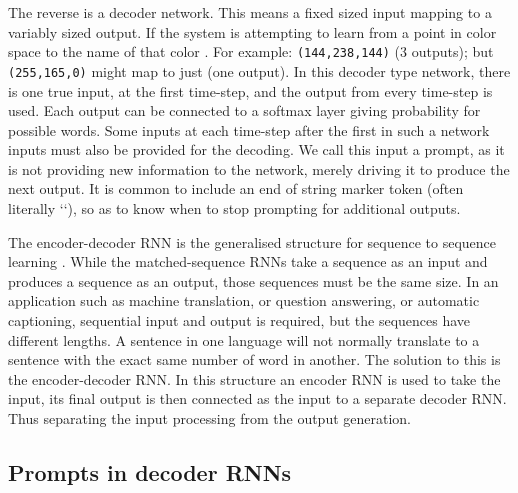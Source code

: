 \documentclass[12pt,parskip]{komatufte}
\begin{document}


The reverse is a decoder network.
This means a fixed sized input mapping to a variably sized output.
If the system is attempting to learn from a point in color space to the name of that color .
For example: \texttt{(144,238,144)}  (3 outputs); but \texttt{(255,165,0)} might map to just  (one output).
In this decoder type network, there is one true input, at the first time-step, and the output from every time-step is used.
Each output can be connected to a softmax layer giving probability for possible words.
Some inputs at each time-step after the first in such a network inputs must also be provided for the decoding.
We call this input a prompt, as it is not providing new information to the network, merely driving it to produce the next output.
It is common to include an end of string marker token (often literally ``),
so as to know when to stop prompting for additional outputs.


The encoder-decoder RNN is the generalised structure for sequence to sequence learning .
While the matched-sequence RNNs take a sequence as an input and produces a sequence as an output, those sequences must be the same size.
In an application such as machine translation, or question answering, or automatic captioning, sequential input and output is required, but the sequences have different lengths.
A sentence in one language will not normally translate to a sentence with the exact same number of word in another.
The solution to this is the encoder-decoder RNN.
In this structure an encoder RNN is used to take the input, its final output is then connected as the input to a separate decoder RNN.
Thus separating the input processing from the output generation.


\subsection{Prompts in decoder RNNs}
\end{document}
